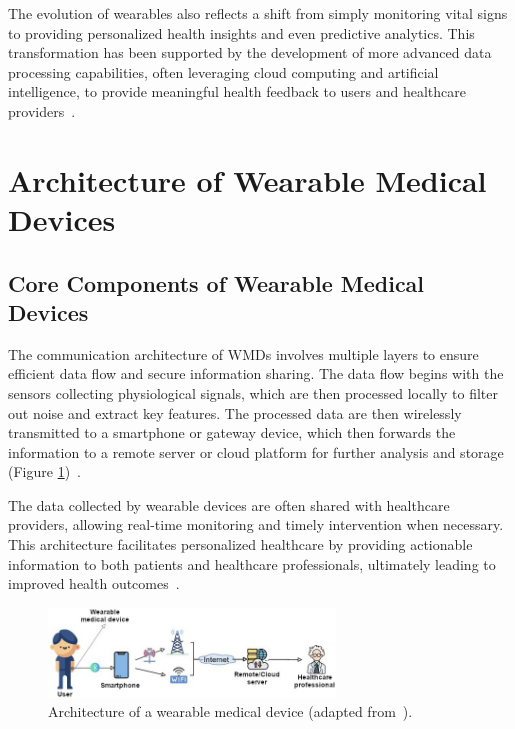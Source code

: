 \documentclass[journal]{IEEEtran}
\begin{document}
    The evolution of wearables also reflects a shift from simply monitoring vital signs to providing personalized health insights and even predictive analytics. This transformation has been supported by the development of more advanced data processing capabilities, often leveraging cloud computing and artificial intelligence, to provide meaningful health feedback to users and healthcare providers~\cite{Ates2022}.

\section{Architecture of Wearable Medical Devices}
\label{4.Architecture}
    \subsection{Core Components of Wearable Medical Devices}

    The communication architecture of WMDs involves multiple layers to ensure efficient data flow and secure information sharing. The data flow begins with the sensors collecting physiological signals, which are then processed locally to filter out noise and extract key features. The processed data are then wirelessly transmitted to a smartphone or gateway device, which then forwards the information to a remote server or cloud platform for further analysis and storage (Figure \ref{fig:architecture})~\cite{Saifuzzaman2021,Ates2022}.

    The data collected by wearable devices are often shared with healthcare providers, allowing real-time monitoring and timely intervention when necessary. This architecture facilitates personalized healthcare by providing actionable information to both patients and healthcare professionals, ultimately leading to improved health outcomes~\cite{Guk2019}.

    \begin{figure}[ht]
    \centering
    \includegraphics[width=3in]{Wearables_SEB_2024-2025_Group1/Figuras/architecture.jpeg}
    \caption{Architecture of a wearable medical device (adapted from~\cite{Saifuzzaman2021}).}
    \label{fig:architecture}
    \end{figure}
    
\end{document}
